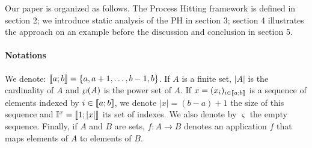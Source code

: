 Our paper is organized as follows.
The Process Hitting framework is defined in section 2;
we introduce static analysis of the PH in section 3;
section 4 illustrates the approach on an example
before the discussion and conclusion in section 5.

\paragraph*{Notations}
We denote: $\llbracket a; b \rrbracket = \{ a, a+1, \dots, b-1, b \}$.
If $A$ is a finite set,
$|A|$ is the cardinality of $A$
and $\wp(A)$ is the power set of $A$.
If $x = (x_i)_{i \in \llbracket a; b \rrbracket}$ is a sequence of elements indexed by $i \in \llbracket a; b \rrbracket$,
we denote $|x| = (b-a)+1$ the size of this sequence
and $\mathbb{I}^{x} = \llbracket 1; |x| \rrbracket$ its set of indexes.
We also denote by $\varsigma$ the empty sequence.
Finally, if $A$ and $B$ are sets,
$f : A \rightarrow B$ denotes an application $f$ that maps elements of $A$ to elements of $B$.
